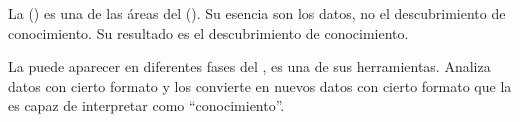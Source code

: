 La \dm (\DM) es una de las áreas del \kdd (\KDD). Su esencia son los datos, no el descubrimiento de conocimiento. Su resultado es el descubrimiento de conocimiento.

La \DM puede aparecer en diferentes fases del \KDD, es una de sus herramientas. Analiza datos con cierto formato y los convierte en nuevos datos con cierto formato que la \KDD es capaz de interpretar como "`conocimiento"'.